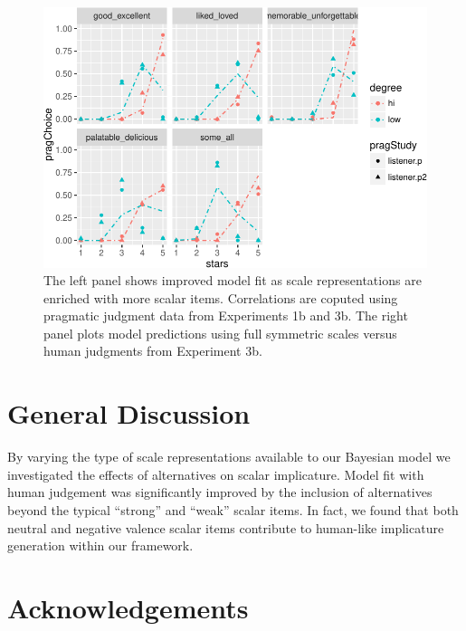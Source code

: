 \documentclass[10pt, letterpaper]{article}
\newenvironment{CodeChunk}{}{}
\begin{document}
\begin{CodeChunk}
\captionsetup{width=0.8\textwidth}\begin{figure}[t]

{\centering \includegraphics{figs/performancePlots-1} 

}

\caption[The left panel shows improved model fit as scale representations are enriched with more scalar items]{The left panel shows improved model fit as scale representations are enriched with more scalar items. Correlations are coputed using pragmatic judgment data from Experiments 1b and 3b. The right panel plots model predictions using full symmetric scales versus human judgments from Experiment 3b.}\label{fig:performancePlots}
\end{figure}
\end{CodeChunk}

\section{General Discussion}\label{general-discussion}

By varying the type of scale representations available to our Bayesian
model we investigated the effects of alternatives on scalar implicature.
Model fit with human judgement was significantly improved by the
inclusion of alternatives beyond the typical ``strong'' and ``weak''
scalar items. In fact, we found that both neutral and negative valence
scalar items contribute to human-like implicature generation within our
framework.

\section{Acknowledgements}\label{acknowledgements}
\end{document}
